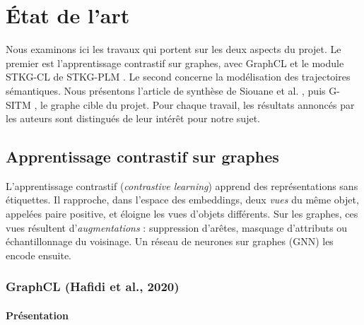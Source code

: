\documentclass[11pt, french, screen, research-development]{report-rd-info}
\begin{document}


\chapter{\'Etat de l'art}
\label{chap:EtatArt}

Nous examinons ici les travaux qui portent sur les deux aspects du projet. 
 Le premier est l'apprentissage contrastif sur graphes, avec GraphCL \cite{hafidi2020graphcl} et le
module STKG-CL de STKG-PLM \cite{chen2025stkgplm}.
 Le second concerne la modélisation des trajectoires sémantiques. Nous présentons l'article de
synthèse de Siouane et al. \cite{siouane2026survey},
puis G-SITM \cite{siouane2026gsitm}, le graphe cible du projet. Pour chaque travail, 
les résultats annoncés par les auteurs sont distingués de leur intérêt pour notre sujet.

\section{Apprentissage contrastif sur graphes}

 L'apprentissage contrastif (\emph{contrastive learning}) apprend des représentations sans
étiquettes.
 Il rapproche, dans l'espace des embeddings, deux \emph{vues} du même objet, appelées paire
positive, et éloigne les vues d'objets différents.
 Sur les graphes, ces vues résultent d'\emph{augmentations} : suppression d'arêtes, masquage
d'attributs ou échantillonnage du voisinage.
Un réseau de neurones sur graphes (GNN) les encode ensuite.

\subsection{GraphCL (Hafidi et al., 2020)}

\subsubsection*{Présentation}
\end{document}
